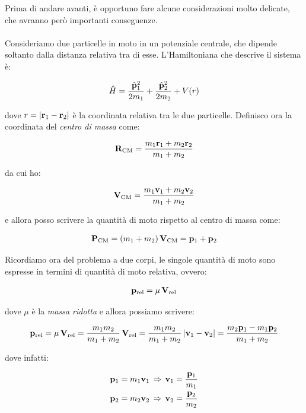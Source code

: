 	Prima di andare avanti, è opportuno fare alcune considerazioni molto delicate, che avranno però importanti conseguenze. 
	\\
	\\
	Consideriamo due particelle in moto in un potenziale centrale, che dipende soltanto dalla distanza relativa tra di esse. L'Hamiltoniana che descrive il sistema è:
	
\begin{align*}
	\hat{H} = \frac{\hat{\vb{p}}^2_1}{2m_1} + \frac{\hat{\vb{p}}^2_2}{2m_2} + V\qty(r)
\end{align*}

	dove $r = |\vb{r}_1 - \vb{r}_2|$ è la coordinata relativa tra le due particelle. Definisco ora la coordinata del \textit{centro di massa} come:
	
\begin{align*}
	\vb{R}_{\text{CM}} = \frac{m_1 \vb{r}_1 + m_2 \vb{r}_2}{m_1 + m_2}
\end{align*}

	da cui ho:
	
\begin{align*}
	\vb{V}_{\text{CM}} = \frac{m_1 \vb{v}_1 + m_2 \vb{v}_2}{m_1 + m_2}
\end{align*}

	e allora posso scrivere la quantità di moto rispetto al centro di massa come:
	
\begin{align*}
	\vb{P}_{\text{CM}} = \qty(m_1 + m_2) \, \vb{V}_{\text{CM}} = \vb{p}_1 + \vb{p}_2
\end{align*}

	Ricordiamo ora del problema a due corpi, le singole quantità di moto sono espresse in termini di quantità di moto relativa, ovvero:
	
\begin{align*}
	\vb{p}_{\text{rel}} = \mu \, \vb{V}_{\text{rel}}
\end{align*}

	dove $\mu$ è la \textit{massa ridotta} e allora possiamo scrivere:

\begin{align*}
	\vb{p}_{\text{rel}} = \mu \, \vb{V}_{\text{rel}} = \frac{m_1 m_2}{m_1 + m_2} \, \vb{V}_{\text{rel}} = \frac{m_1 m_2}{m_1 + m_2} \, |\vb{v}_1 - \vb{v}_2| = \frac{m_2 \vb{p}_1 - m_1 \vb{p}_2}{ m_1 + m_2 } 
\end{align*}

	dove infatti:
	
\begin{align*}
	& \vb{p}_1 = m_1 \vb{v}_1 \, \Rightarrow \, \vb{v}_1 = \frac{\vb{p}_1}{m_1} \\
	& \vb{p}_2 = m_2 \vb{v}_2 \, \Rightarrow \, \vb{v}_2 = \frac{\vb{p}_2}{m_2}
\end{align*}

